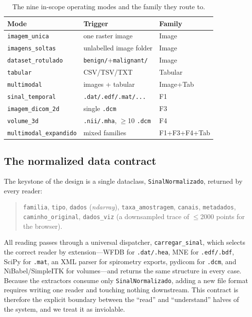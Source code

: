 \documentclass[10pt,twocolumn]{article}
\begin{document}
\begin{table}[t]
\centering
\caption{The nine in-scope operating modes and the family they route to.}
\label{tab:modes}
\small
\begin{tabular}{@{}lll@{}}
\toprule
Mode & Trigger & Family \\
\midrule
\texttt{imagem\_unica}      & one raster image            & Image \\
\texttt{imagens\_soltas}    & unlabelled image folder     & Image \\
\texttt{dataset\_rotulado}  & \texttt{benign/}+\texttt{malignant/} & Image \\
\texttt{tabular}            & CSV/TSV/TXT                 & Tabular \\
\texttt{multimodal}         & images + tabular            & Image+Tab \\
\texttt{sinal\_temporal}    & \texttt{.dat/.edf/.mat/...}  & F1 \\
\texttt{imagem\_dicom\_2d}  & single \texttt{.dcm}        & F3 \\
\texttt{volume\_3d}         & \texttt{.nii/.mha}, $\geq$10 \texttt{.dcm} & F4 \\
\texttt{multimodal\_expandido} & mixed families           & F1+F3+F4+Tab \\
\bottomrule
\end{tabular}
\end{table}

\subsection{The normalized data contract}
The keystone of the design is a single dataclass, \texttt{SinalNormalizado},
returned by every reader:
\begin{quote}\small
\texttt{familia}, \texttt{tipo}, \texttt{dados} (\emph{ndarray}),
\texttt{taxa\_amostragem}, \texttt{canais}, \texttt{metadados},
\texttt{caminho\_original}, \texttt{dados\_viz} (a downsampled trace of
$\leq$2000 points for the browser).
\end{quote}
All reading passes through a universal dispatcher, \texttt{carregar\_sinal},
which selects the correct reader by extension---WFDB for
\texttt{.dat/.hea}, MNE for \texttt{.edf/.bdf}, SciPy for \texttt{.mat}, an XML
parser for spirometry exports, pydicom for \texttt{.dcm}, and NiBabel/SimpleITK
for volumes---and returns the same structure in every case. Because the
extractors consume only \texttt{SinalNormalizado}, adding a new file format
requires writing one reader and touching nothing downstream. This contract is
therefore the explicit boundary between the ``read'' and ``understand'' halves
of the system, and we treat it as inviolable.
\end{document}
